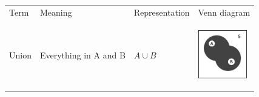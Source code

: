         \begin{center}
      \label{m39373*eip-360}
    \noindent
      \tablelasttail{}
      \begin{xtabular*}{\mytablewidth}[t]{|p{10\mystarwidth}|p{10\mystarwidth}|p{10\mystarwidth}|p{10\mystarwidth}|}\hline
        Term &
        Meaning &
        Representation &
        Venn diagram%
     \tabularnewline{}
        Union &
        Everything in A and B &
        $A\cup B$ &
    \setcounter{subfigure}{0}
\label{m39373*uid14547}
    \begin{center}
    \label{m39373*uid14547!!!underscore!!!media}\label{m39373*uid14547!!!underscore!!!printimage}\includegraphics[width=80px]{col11306.imgs/m39373_union.png} %

\end{center}
\end{xtabular*}
\end{center}
